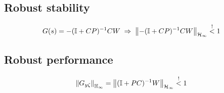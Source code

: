 \subsection{Robust stability}
    $$
        G(s) = -(\mathbb{I}+CP)^{-1}CW \; \Rightarrow \; \left\| -(\mathbb{I}+CP)^{-1}CW \right\|_{\mathcal{H}_{\infty}} \overset{!}{<} 1
    $$

\subsection{Robust performance}
    $$
    \left\| G_{y\zeta} \right\|_{\mathbb{H}_{\infty}} = \left\| (\mathbb{I}+PC)^{-1}W \right\|_{\mathcal{H}_{\infty}} \overset{!}{<} 1
    $$
